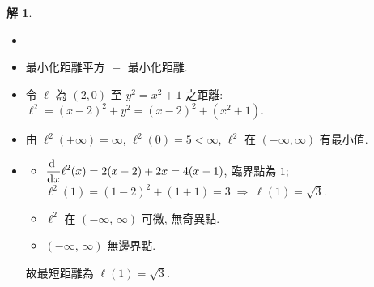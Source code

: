 \documentclass[12pt]{extarticle}
\newcommand{\ds}{\displaystyle}
\newcommand{\ie}{\;\Longrightarrow\;}
\newcommand{\diff}[2]{ \frac{\mathrm{d}\hfil#1\hfil}{\mathrm{d}#2}}
\theoremstyle{definition}
\newtheorem*{ex}{例}
\newtheorem*{sol}{解}
\begin{document}
\begin{sol}
  \begin{itemize}\setlength\itemsep{0em}
    \item[]
    \item 最小化距離平方 $\equiv$ 最小化距離. 
    \item 令 $\ell$ 為 $(2, 0)$ 至 $y^2 = x^2 + 1$ 之距離: $\ds\ell^2 = (x - 2)^2 + y^2 = (x - 2)^2 + (x^2 + 1)$. 
    \item 由 $\ds\ell^2(\pm\infty)=\infty$, $\ds\ell^2(0) = 5 < \infty$, $\ell^2$ 在 $(-\infty, \infty)$ 有最小值. 
    \item 
      \begin{itemize}\setlength\itemsep{0em}
        \item $\ds\diff{}{x} \ell^2(x) = 2(x - 2) + 2x = 4(x - 1)$, 臨界點為 $1$; $\ell^2(1) = (1 - 2)^2 + (1 + 1) = 3\ie \ell(1) = \sqrt{3}$. 
        \item $\ell^2$ 在 $(-\infty,\,\infty)$ 可微, 無奇異點. 
        \item $(-\infty,\,\infty)$ 無邊界點. 
      \end{itemize}
      故最短距離為 $\ell(1) = \sqrt{3}$. 
    \end{itemize}
\end{sol}

%
\end{document}
